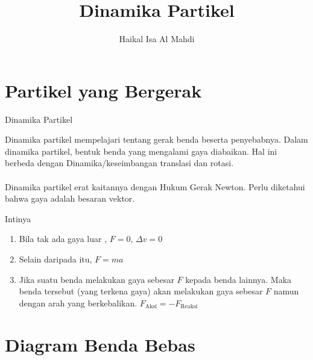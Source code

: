 \documentclass[10pt,aspectratio=54, handout]{beamer}
\author[Haikal Isa]{Haikal Isa Al Mahdi}
\title{Dinamika Partikel}
\begin{document}
  \frame{\maketitle}
  
  \section{Partikel yang Bergerak}
  \label{sec:Pendahuluan}
  
  \begin{frame}{Dinamika Partikel}
    
    Dinamika partikel mempelajari tentang gerak benda beserta penyebabnya. Dalam dinamika partikel, bentuk benda yang mengalami gaya diabaikan. Hal ini berbeda dengan Dinamika/keseimbangan translasi dan rotasi. \\~\\
    Dinamika partikel erat kaitannya dengan Hukum Gerak Newton. Perlu diketahui bahwa gaya adalah besaran vektor. 
    \begin{block}{Intinya}
      \begin{enumerate}
        \item Bila tak ada gaya luar , $F=0,\, \Delta v = 0$
        \item Selain daripada itu, $F=ma$
        \item Jika suatu benda melakukan gaya sebesar $F$ kepada benda lainnya. Maka benda tersebut (yang terkena gaya) akan melakukan gaya sebesar $F$ namun dengan arah yang berkebalikan. $F_{\text{Aksi}}=-F_{\text{Reaksi}}$
      \end{enumerate}
    \end{block}
    
    

  
  
  
  \end{frame}
  
  \section{Diagram Benda Bebas}
  \label{sec:DIAGRAM BENDA BEBAS}
  
\end{document}

